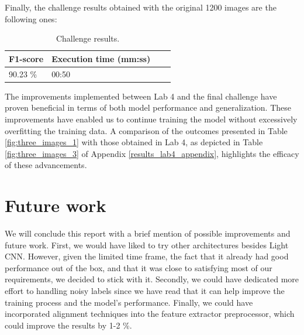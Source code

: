 \documentclass[11pt, a4paper]{article}
\numberwithin{equation}{subsection}
\begin{document}
Finally, the challenge results obtained with the original 1200 images are the following ones:

\begin{table}[htbp]
    \centering
    \label{tab:challenge_results}
    \caption{Challenge results.}
    \begin{tabular}{|l|l|l|l|}
    \hline
    \textbf{F1-score} & \textbf{Execution time (mm:ss)} \\ \hline
    90.23 \% & 00:50 \\
    \hline
    \end{tabular}
\end{table}

The improvements implemented between Lab 4 and the final challenge have proven beneficial in terms of both model performance and generalization. These improvements have enabled us to continue training the model without excessively overfitting the training data. A comparison of the outcomes presented in Table \ref{fig:three_images_1} with those obtained in Lab 4, as depicted in Table \ref{fig:three_images_3} of Appendix \ref{results_lab4_appendix}, highlights the efficacy of these advancements.

\section{Future work}

We will conclude this report with a brief mention of possible improvements and future work. First, we would have liked to try other architectures besides Light CNN. However, given the limited time frame, the fact that it already had good performance out of the box, and that it was close to satisfying most of our requirements, we decided to stick with it. Secondly, we could have dedicated more effort to handling noisy labels since we have read that it can help improve the training process and the model's performance. Finally, we could have incorporated alignment techniques into the feature extractor preprocessor, which could improve the results by 1-2 \%.

\newpage


\end{document}
